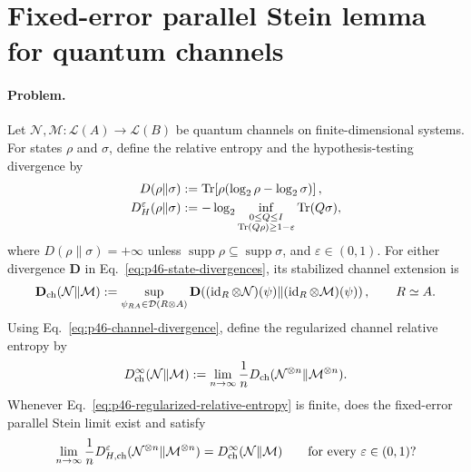 \section{Fixed-error parallel Stein lemma for quantum channels}
\label{sec:op_08387c140f552732}

\paragraph{Problem.}
Let $\mathcal N,\mathcal M:\mathcal L(A)\to\mathcal L(B)$ be quantum
channels on finite-dimensional systems.  For states $\rho$ and $\sigma$,
define the relative entropy and the hypothesis-testing divergence by
\begin{equation}
  \begin{aligned}
    D(\rho\|\sigma)
      &:={\rm Tr}\!\left[\rho(\log_2\rho-\log_2\sigma)\right],\\
    D_H^\varepsilon(\rho\|\sigma)
      &:=-\log_2\inf_{\substack{0\leq Q\leq I\\
                    {\rm Tr}(Q\rho)\geq1-\varepsilon}}
                    {\rm Tr}(Q\sigma),
  \end{aligned}
  \label{eq:p46-state-divergences}
\end{equation}
where $D(\rho\|\sigma)=+\infty$ unless
$\operatorname{supp}\rho\subseteq\operatorname{supp}\sigma$, and
$\varepsilon\in(0,1)$.  For either divergence $\mathbf D$ in
Eq.~\eqref{eq:p46-state-divergences}, its stabilized channel extension is
\begin{equation}
  \mathbf D_{\rm ch}(\mathcal N\|\mathcal M)
  :=\sup_{\psi_{RA}\in\mathcal D(R\otimes A)}
  \mathbf D\!\left(
    (\operatorname{id}_R\otimes\mathcal N)(\psi)
    \middle\|
    (\operatorname{id}_R\otimes\mathcal M)(\psi)
  \right),
  \qquad R\simeq A.
  \label{eq:p46-channel-divergence}
\end{equation}
Using Eq.~\eqref{eq:p46-channel-divergence}, define the regularized channel
relative entropy by
\begin{equation}
  D_{\rm ch}^{\infty}(\mathcal N\|\mathcal M)
  :=\lim_{n\to\infty}\frac1n
  D_{\rm ch}(\mathcal N^{\otimes n}\|\mathcal M^{\otimes n}).
  \label{eq:p46-regularized-relative-entropy}
\end{equation}
Whenever Eq.~\eqref{eq:p46-regularized-relative-entropy} is finite, does the
fixed-error parallel Stein limit exist and satisfy
\begin{equation}
  \lim_{n\to\infty}\frac1n
  D_{H,{\rm ch}}^\varepsilon
  (\mathcal N^{\otimes n}\|\mathcal M^{\otimes n})
  =D_{\rm ch}^{\infty}(\mathcal N\|\mathcal M)
  \qquad\text{for every }\varepsilon\in(0,1)?
  \label{eq:p46-fixed-error-stein}
\end{equation}

